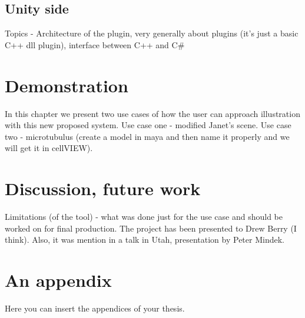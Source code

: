 \documentclass[
  digital, %
  table,   %
  lof,     %
  lot,     %
]{fithesis3}
\begin{document}
\section{Unity side}
Topics - Architecture of the plugin, very generally about plugins (it's just a basic C++ dll plugin), interface between C++ and C\#

\chapter{Demonstration}
In this chapter we present two use cases of how the user can approach illustration with this new proposed system.
Use case one - modified Janet's scene.
Use case two - microtubulus (create a model in maya and then name it properly and we will get it in cellVIEW).

\chapter{Discussion, future work}
Limitations (of the tool) - what was done just for the use case and should be worked on for final production.
The project has been presented to Drew Berry (I think). Also, it was mention in a talk in Utah, presentation by Peter Mindek.

\appendix %
\chapter{An appendix}
Here you can insert the appendices of your thesis.
\end{document}
